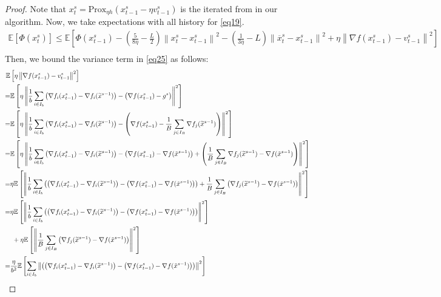 \documentclass{article}
\newcommand*{\Po}{\text{Prox}}
\newcommand*{\E}{\mathbb{E}}
\newcommand{\norm}[1]{\left\lVert#1\right\rVert}
\theoremstyle{definition}
\theoremstyle{remark}
\begin{document}
\begin{proof}
Note that $x_t^s = \Po_{\eta h}(x_{t-1}^s - \eta v_{t-1}^s)$ is the iterated from in our algorithm. Now, we take expectations with all history for \eqref{eq19}.
 \begin{equation}\label{eq25}
 \begin{split} 
\E[\Phi({x}_{t}^s)] \leq \E\left[\Phi({x}_{t-1}^s)  -(\frac{5}{8\eta} - \frac{L}{2})\norm{{x}_t^s-x_{t-1}^s}^2- \left(\frac{1}{3\eta}-L\right)\norm{\overline{x}_t^s-x_{t-1}^s}^2+\eta \norm{\nabla f(x_{t-1}^s)-v_{t-1}^s}^2\right]\\
 \end{split}
 \end{equation}
 Then, we bound the variance term in \eqref{eq25} as follows:
 \begin{align}
  \E&\left[\eta\norm{\nabla f(x_{t-1}^s)-v_{t-1}^s}^2\right]\notag\\
   =&\E\left[\eta\norm{\frac{1}{b}\sum_{i\in I_b}\left(\nabla f_i(x_{t-1}^s)-\nabla f_i(\widetilde{x}^{s-1})\right) - \left(\nabla f(x_{t-1}^s)-g^s\right)}^2\right]\notag\\
   =&\E\left[\eta\norm{\frac{1}{b}\sum_{i\in I_b}\left(\nabla f_i(x_{t-1}^s)-\nabla f_i(\widetilde{x}^{s-1})\right) - \left(\nabla f(x_{t-1}^s)-\frac{1}{B}\sum_{j\in I_B}\nabla f_j(\widetilde{x}^{s-1})\right)}^2\right]\notag\\
   =&\notag\E\left[\eta\norm{\frac{1}{b}\sum_{i\in I_b}\left(\nabla f_i(x_{t-1}^s)-\nabla f_i(\widetilde{x}^{s-1})\right) - \left(\nabla f(x_{t-1}^s) - \nabla f(\tilde{x}^{s-1}) \right)+ \left(\frac{1}{B}\sum_{j\in I_B}\nabla f_j(\widetilde{x}^{s-1}) - \nabla f(\tilde{x}^{s-1})\right)}^2\right]\\
   =&\notag\eta\E\left[\norm{\frac{1}{b}\sum_{i\in I_b}\left(\left(\nabla f_i(x_{t-1}^s)-\nabla f_i(\widetilde{x}^{s-1})\right) - \left(\nabla f(x_{t-1}^s) - \nabla f(\tilde{x}^{s-1}) \right)\right)+ \frac{1}{B}\sum_{j\in I_B}\left(\nabla f_j(\widetilde{x}^{s-1}) - \nabla f(\tilde{x}^{s-1})\right)}^2\right]\\
    = &\notag\eta\E\left[\norm{\frac{1}{b}\sum_{i\in I_b}\left(\left(\nabla f_i(x_{t-1}^s)-\nabla f_i(\widetilde{x}^{s-1})\right) - \left(\nabla f(x_{t-1}^s) - \nabla f(\tilde{x}^{s-1}) \right)\right)}^2\right]\\
   &\,\, + \eta \E \left[ \norm{\frac{1}{B}\sum_{j\in I_B}\left(\nabla f_j(\widetilde{x}^{s-1}) - \nabla f(\tilde{x}^{s-1})\right)}^2\right]\label{eq26}\\
   = &\notag\frac{\eta}{b^2}\E\left[\sum_{i\in I_b}\norm{\left(\left(\nabla f_i(x_{t-1}^s)-\nabla f_i(\widetilde{x}^{s-1})\right) - \left(\nabla f(x_{t-1}^s) - \nabla f(\tilde{x}^{s-1}) \right)\right)}^2\right]\\

\end{align}
\end{proof}
\end{document}
